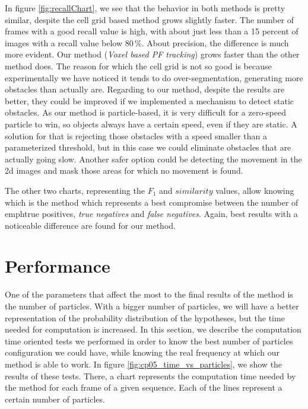 In figure \ref{fig:recallChart}, we see that the behavior in both methods is pretty similar, despite the cell grid based method grows slightly faster. The number of frames with a good recall value is high, with about just less than a 15 percent of images with a recall value below 80\,\%. About precision, the difference is much more evident. Our method (\emph{Voxel based PF tracking}) grows faster than the other method does. The reason for which the cell grid is not so good is because experimentally we have noticed it tends to do over-segmentation, generating more obstacles than actually are. Regarding to our method, despite the results are better, they could be improved if we implemented a mechanism to detect static obstacles. As our method is particle-based, it is very difficult for a zero-speed particle to win, so objects always have a certain speed, even if they are static. A solution for that is rejecting those obstacles with a speed smaller than a parameterized threshold, but in this case we could eliminate obstacles that are actually going slow. Another safer option could be detecting the movement in the 2d images and mask those areas for which no movement is found.

The other two charts, representing the $F_1$ and $similarity$ values, allow knowing which is the method which represents a best compromise between the number of emph{true positives}, \emph{true negatives} and \emph{false negatives}. Again, best results with a noticeable difference are found for our method.

\section{Performance}\label{ch:chapter05_02_04}

One of the parameters that affect the most to the final results of the method is the number of particles. With a bigger number of particles, we will have a better representation of the probability distribution of the hypotheses, but the time needed for computation is increased. In this section, we describe the computation time oriented tests we performed in order to know the best number of particles configuration we could have, while knowing the real frequency at which our method is able to work.
In figure \ref{fig:cp05_time_vs_particles}, we show the results of these tests. There, a chart represents the computation time needed by the method for each frame of a given sequence. Each of the lines represent a certain number of particles.

